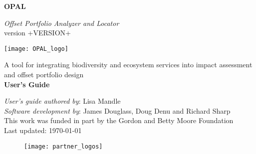 
\begin{titlepage}
    \begin{center}
        \vspace*{1cm}
        
        {\Huge \textbf{OPAL}}
        
        \vspace{0.5cm}
        {\Large \em Offset Portfolio Analyzer and Locator}\\
        \vspace{0.25cm}
        {\large version +VERSION+}%
        
        \vspace{0.75cm}
        \texttt{[image: OPAL\_logo]}
        \vspace{0.75cm}
        
        {\Large A tool for integrating biodiversity and ecosystem services into impact assessment
        and offset portfolio design}\\
        \vspace{0.5cm}
        {\huge \textbf{User's Guide}}
      \end{center}        
        \vfill
        
        {\setlength{\parindent}{0cm}
        
        	{\em User's guide authored by}: Lisa Mandle\\
        	{\em Software development by}: James Douglass, Doug Denu and Richard Sharp\\
        	
        	This work was funded in part by the Gordon and Betty Moore Foundation\\
        	
        	Last updated: \today
        	
        }
        

        \begin{figure}[b]
        	\texttt{[image: partner\_logos]}
        \end{figure}
      
\end{titlepage}
